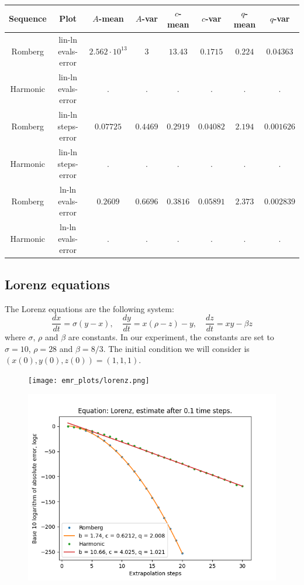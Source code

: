 \begin{table}[H]
    \centering
    \small
     \begin{tabular}{c|c||c|c|c|c|c|c}
Sequence & Plot & \(A\)-mean & \(A\)-var & \(c\)-mean & \(c\)-var & \(q\)-mean & \(q\)-var\\\hline
Romberg & lin-ln evals-error & \(2.562\cdot 10^{13}\) & \(3\) & \(13.43\) & \(0.1715\) & \(0.224\) & \(0.04363\) \\
Harmonic & lin-ln evals-error & . & . & . & . & . & . \\
Romberg & lin-ln steps-error & \(0.07725\) & \(0.4469\) & \(0.2919\) & \(0.04082\) & \(2.194\) & \(0.001626\) \\
Harmonic & lin-ln steps-error & . & . & . & . & . & . \\
Romberg & ln-ln evals-error & \(0.2609\) & \(0.6696\) & \(0.3816\) & \(0.05891\) & \(2.373\) & \(0.002839\) \\
Harmonic & ln-ln evals-error & . & . & . & . & . & . \\
    \end{tabular}
    \label{tab:my_label}
\end{table}

\subsection{Lorenz equations}

The Lorenz equations are the following system: 
\[
\frac{dx}{dt} = \sigma (y-x),\quad \frac{dy}{dt} = x(\rho - z) - y,\quad \frac{dz}{dt} = xy - \beta z
\]
where \(\sigma,\,\rho\) and \(\beta\) are constants. In our experiment, the constants are set to \(\sigma = 10\), \(\rho = 28\) and \(\beta = 8/3\). The initial condition we will consider is \((x(0),y(0),z(0)) = (1,1,1)\).\\

\begin{figure}[H]
\centering
\begin{minipage}{0.45\textwidth}
\centering
\texttt{[image: emr\_plots/lorenz.png]}
\end{minipage}
\begin{minipage}{0.45\textwidth}
\centering
\includegraphics[scale=0.45]{emr_plots/lorenz_hp_steps.png}
\end{minipage}
\end{figure}

